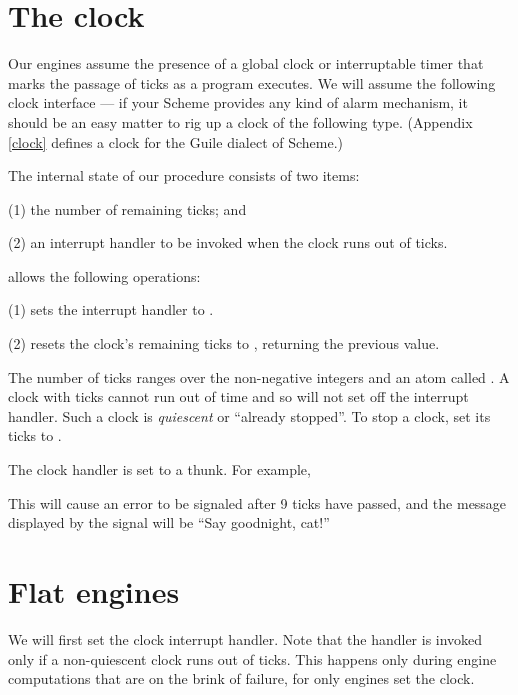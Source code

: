 
\section{The clock}
\label{engine-clock}

Our engines assume the presence of a global clock or
interruptable timer that marks the passage of ticks as
a program executes.  We will assume the following clock
interface --- if your Scheme provides any kind of alarm
mechanism, it should be an easy matter to rig up a
clock of the following type. (Appendix \ref{clock}
defines a clock for the Guile \cite{guile} dialect of
Scheme.)

The internal state of our  procedure consists
of two items:

(1) the number of remaining ticks; and

(2) an interrupt handler to be invoked when the
clock runs out of ticks.

 allows the following operations:

(1)  sets the
interrupt handler to .

(2)  resets the clock's
remaining ticks to , returning the
previous value.

The number of ticks ranges over the non-negative
integers and an atom called .  A clock with
 ticks cannot run out of time and so will
not set off the interrupt handler.  Such a clock is
{\em quiescent} or ``already stopped''.  To stop a
clock, set its ticks to .

The clock handler is set to a thunk.  For example,


\n This will cause an error to be signaled after 9
ticks have passed, and the message displayed by the
signal will be ``Say goodnight, cat!''


\section{Flat engines}

We will first set the clock interrupt handler.  Note
that the handler is invoked only if a non-quiescent
clock runs out of ticks.  This happens only during
engine computations that are on the brink of failure,
for only engines set the clock.

